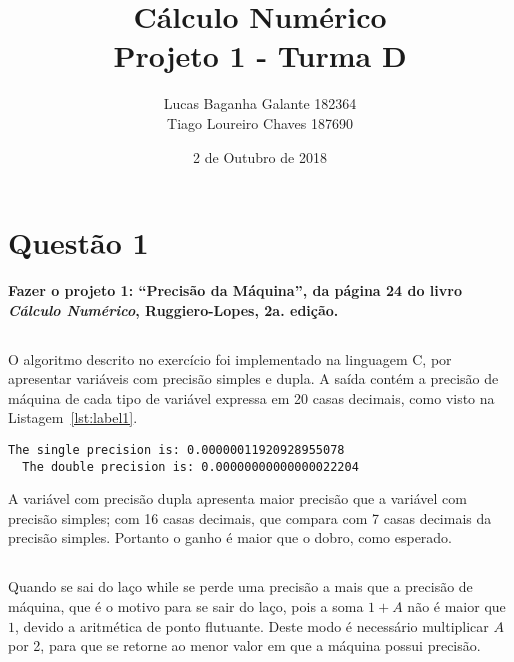 \documentclass[12pt,a4paper,final]{article}
\author{Lucas Baganha Galante 182364\\Tiago Loureiro Chaves 187690}
\title{Cálculo Numérico \\ Projeto 1 - Turma D}
\date{2 de Outubro de 2018}
\begin{document}
\onehalfspace %

\maketitle


\section{Questão 1}
\textbf{Fazer o projeto 1: ``Precisão da Máquina'',
da página 24 do livro \textit{Cálculo Numérico}, Ruggiero-Lopes, 2a. edição.}

\subsection{}

O algoritmo descrito no exercício foi implementado na linguagem C, por apresentar
variáveis com precisão simples e dupla. A saída contém a precisão de máquina de
cada tipo de variável expressa em 20 casas decimais, como visto na Listagem~\ref{lst:label1}.

\begin{lstlisting}[caption= \textbf{Precisão de máquina para variáveis simples e duplas.},label={lst:label1}]
  The single precision is: 0.00000011920928955078
  The double precision is: 0.00000000000000022204
\end{lstlisting}

A variável com precisão dupla apresenta maior precisão que a variável com precisão
simples; com 16 casas decimais, que compara com 7 casas decimais da precisão simples. Portanto o ganho
é maior que o dobro, como esperado.

\subsection{}

Quando se sai do laço while se perde uma precisão a mais que a precisão de máquina, que é o
motivo para se sair do laço, pois a soma $1+A$ não é maior que $1$, devido a aritmética de ponto
flutuante. Deste modo é necessário multiplicar $A$ por 2, para que se retorne ao menor valor em que
a máquina possui precisão.

\subsection{}
\end{document}

